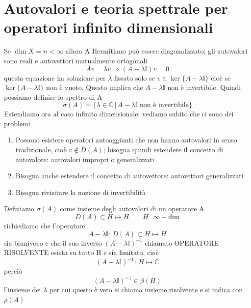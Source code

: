\documentclass[a4paper,11pt]{report}
\theoremstyle{remark}
\theoremstyle{definition}
\newcommand{\C}{\mathbb{C}}
\begin{document}
\section{Autovalori e teoria spettrale per operatori infinito dimensionali}
Se $\dim{X} = n < \infty$ allora A Hermitiano può essere diagonalizzato; gli autovalori sono reali e autovettori mutualmente ortogonali
\begin{equation*}
	Av = \lambda v \Rightarrow (A-\lambda\mathbb{I})v =0
\end{equation*}
questa equazione ha soluzione per $\lambda$ fissato solo se $v \in \ker{\{A-\lambda\mathbb{I}\}}$ cioè se $\ker{\{A-\lambda\mathbb{I}\}}$ non è vuoto. Questo implica che $A - \lambda\mathbb{I}$ non è invertibile. Quindi possiamo definire lo spettro di A 
\begin{equation*}
	\sigma(A) = \{\lambda\in \C \, | \, A-\lambda\mathbb{I} \text{ non è invertibile}\}
\end{equation*}
Estendiamo ora al caso infinito dimensionale: vediamo subito che ci sono dei problemi
\begin{enumerate}
	\item Possono esistere operatori autoaggiunti che non hanno autovalori in senso tradizionale, cioè $v \not\in D(A)$; bisogna quindi estendere il concetto di autovalore: autovalori impropri o generalizzati
	\item Bisogna anche estendere il concetto di autovettore: autovettori generalizzati
	\item Bisogna rivisitare la nozione di invertibilità
\end{enumerate}
Definiamo $\sigma(A)$ come insieme degli autovalori di un operatore A
\begin{equation*}
	D(A) \subset H \mapsto H \qquad H \text{ $\infty-$dim}
\end{equation*}
richiediamo che l'operatore 
\begin{equation*}
	A-\lambda \mathbb{I} : \, D(A) \subset H \mapsto H
\end{equation*}
sia biunivoco e che il suo inverso ${(A-\lambda\mathbb{I})}^{-1}$ chiamato OPERATORE RISOLVENTE esista su tutto H e sia limitato, cioè
\begin{equation*}
	{(A-\lambda\mathbb{I})}^{-1} : \, H \mapsto \C
\end{equation*}
perciò
\begin{equation*}
	{(A-\lambda\mathbb{I})}^{-1} \in \beta(H)
\end{equation*}
l'insieme dei $\lambda$ per cui questo è vero si chiama insieme risolvente e si indica con $\rho(A)$
\end{document}
